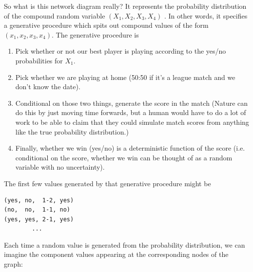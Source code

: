 So what is this network diagram really? It represents the probability distribution of the compound random variable $(X_1, X_2, X_3, X_4)$ . In other words, it specifies a generative procedure which spits out compound values of the form $(x_1, x_2, x_3, x_4)$. The generative procedure is
\begin{enumerate}
\item Pick whether or not our best player is playing according to the yes/no probabilities for $X_1$.
\item Pick whether we are playing at home (50:50 if it's a league match and we don't know the date).
\item Conditional on those two things, generate the score in the match (Nature can do this by just moving time forwards, but a human would have to do a lot of work to be able to claim that they could simulate match scores from anything like the true probability distribution.)
\item Finally, whether we win (yes/no) is a deterministic function of the score (i.e. conditional on the score, whether we win can be thought of as a random variable with no uncertainty).
\end{enumerate}
The first few values generated by that generative procedure might be

\begin{verbatim}
(yes, no,  1-2, yes)
(no,  no,  1-1, no)
(yes, yes, 2-1, yes)
        ...
\end{verbatim}

Each time a random value is generated from the probability distribution, we can imagine the component values appearing at the corresponding nodes of the graph:


